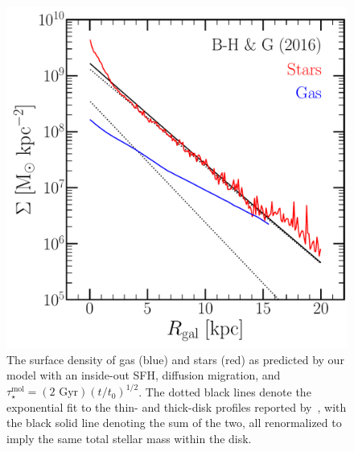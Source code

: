 \documentclass[a4paper, fleqn, usenatbib, useAMS]{mnras}
\begin{document}
\begin{figure} 
\centering 
\includegraphics[scale = 0.45]{surface_density_gradient_timedep.pdf} 
\caption{The surface density of gas (blue) and stars (red) as predicted by our 
model with an inside-out SFH, diffusion migration, and 
$\tau_\star^\text{mol} = (\text{2 Gyr})(t/t_0)^{1/2}$. The dotted black lines 
denote the exponential fit to the thin- and thick-disk profiles reported 
by~\citet{Bland-Hawthorn2016}, with the black solid line denoting the sum of 
the two, all renormalized to imply the same total stellar mass within the 
disk. }
\label{fig:surface_density} 
\end{figure} 
\end{document}
